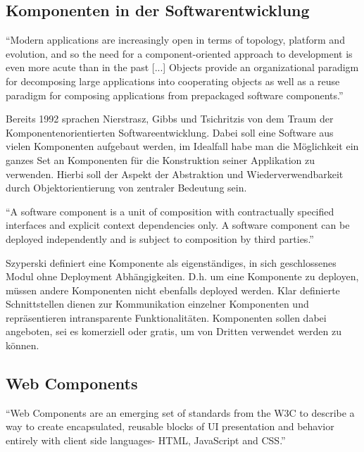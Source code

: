 \subsection{Komponenten in der Softwarentwicklung}

``Modern applications are increasingly
open in terms of topology,
platform and evolution, and so the
need for a component-oriented
approach to development is even
more acute than in the past [...]  Objects provide an organizational
paradigm for decomposing large
applications into cooperating objects
as well as a reuse paradigm for
composing applications from prepackaged
software components.''
\cite{nierstrasz1992component}

\vspace{0.5cm}

Bereits 1992 sprachen Nierstrasz, Gibbs und Tsichritzis von dem Traum der Komponentenorientierten Softwareentwicklung.
Dabei soll eine Software aus vielen Komponenten aufgebaut werden, im Idealfall habe man die Möglichkeit ein
ganzes Set an Komponenten für die Konstruktion seiner Applikation zu verwenden.
Hierbi soll der Aspekt der Abstraktion und Wiederverwendbarkeit durch Objektorientierung von zentraler Bedeutung sein.

\vspace{0.5cm}
``A software component is a unit of composition with contractually specified interfaces and explicit
context dependencies only. A software component can be deployed independently and is subject to composition
by third parties.''
\cite{Szyperski}
\vspace{0.5cm}

Szyperski definiert eine Komponente als eigenständiges, in sich geschlossenes Modul ohne Deployment
Abhängigkeiten. D.h. um eine Komponente zu deployen, müssen andere Komponenten nicht ebenfalls deployed werden.
Klar definierte Schnittstellen dienen zur Kommunikation einzelner Komponenten und repräsentieren intransparente
Funktionalitäten. Komponenten sollen dabei angeboten, sei es komerziell oder gratis,
um von Dritten verwendet werden zu können.


\subsection{Web Components}

``Web Components are an emerging set of standards from the W3C to describe a way to create encapsulated,
reusable blocks of UI presentation and behavior entirely with client side languages- HTML, JavaScript and CSS.''
\cite[42]{Web-Component-Architecture}
\vspace{1cm}


